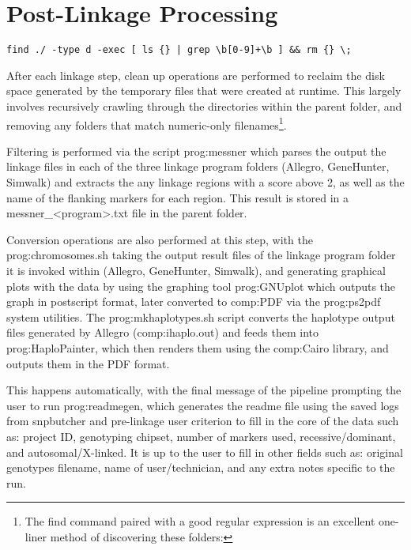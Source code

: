 \section{Post-Linkage Processing}

\begin{lrbox}\scriptsize
    \verb!find ./ -type d -exec [ ls {} | grep \b[0-9]+\b ] && rm {} \;!
\end{lrbox}%

After each linkage step, clean up operations are performed to reclaim the disk space generated by the temporary files that were created at runtime. This largely involves recursively crawling through the directories within the parent folder, and removing any folders that match numeric-only filenames\footnote{The find command paired with a good regular expression is an excellent one-liner method of discovering these folders: \usebox{}}.

Filtering is performed via the script \gls{prog:messner} which parses the output the linkage files in each of the three linkage program folders (Allegro, GeneHunter, Simwalk) and extracts the any linkage regions with a score above 2, as well as the name of the flanking markers for each region. This result is stored in a messner\_<program>.txt file in the parent folder.

Conversion operations are also performed at this step, with the \gls{prog:chromosomes.sh} taking the output result files of the linkage program folder it is invoked within (Allegro, GeneHunter, Simwalk), and generating graphical plots with the data by using the graphing tool \gls{prog:GNUplot} which outputs the graph in postscript format, later converted to \gls{comp:PDF} via the \gls{prog:ps2pdf} system utilities. The \gls{prog:mkhaplotypes.sh} script converts the haplotype output files generated by Allegro (\gls{comp:ihaplo.out}) and feeds them into \gls{prog:HaploPainter}, which then renders them using the \gls{comp:Cairo} library, and outputs them in the PDF format.

This happens automatically, with the final message of the pipeline prompting the user to run \gls{prog:readmegen}, which generates the readme file using the saved logs from snpbutcher and pre-linkage user criterion to fill in the core of the data such as: project ID, genotyping chipset, number of markers used, recessive/dominant, and autosomal/X-linked. It is up to the user to fill in other fields such as: original genotypes filename, name of user/technician, and any extra notes specific to the run.

